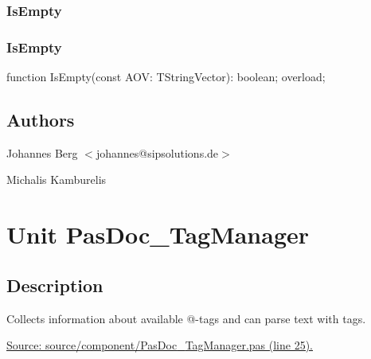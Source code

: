 \documentclass{report}
\newif\ifpdf
\begin{document}
\subsection*{\large{\textbf{IsEmpty}}\normalsize\hspace{1ex}\hrulefill}
\else
\subsection*{IsEmpty}
\fi
\label{PasDoc_StringVector-IsEmpty}
\begin{list}{}{
\setlength{\itemindent}{0cm}
\setlength{\listparindent}{0cm}
\setlength{\leftmargin}{\evensidemargin}
\addtolength{\leftmargin}{\tmplength}
\settowidth{\labelsep}{X}
\addtolength{\leftmargin}{\labelsep}
\setlength{\labelwidth}{\tmplength}
}
\item[\textbf{Declaration}\hfill]
\ifpdf
\begin{flushleft}
\fi
\begin{ttfamily}
function IsEmpty(const AOV: TStringVector): boolean; overload;\end{ttfamily}

\ifpdf
\end{flushleft}
\fi

\end{list}
\section{Authors}
\par
Johannes Berg {$<$}johannes@sipsolutions.de{$>$}

\par
Michalis Kamburelis

\chapter{Unit PasDoc{\_}TagManager}
\label{PasDoc_TagManager}
\section{Description}
Collects information about available @{-}tags and can parse text with tags.\par
\href{https://github.com/pasdoc/pasdoc/blob/master/source/component/PasDoc_TagManager.pas#L25}{Source: source/component/PasDoc{\_}TagManager.pas (line 25).}
\end{document}
